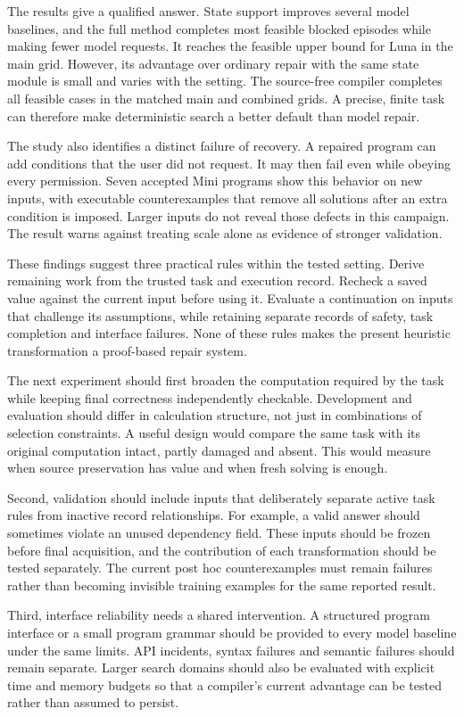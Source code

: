 \documentclass[conference]{IEEEtran}
\begin{document}
The results give a qualified answer. State support improves several model baselines, and the full method completes most feasible blocked episodes while making fewer model requests. It reaches the feasible upper bound for Luna in the main grid. However, its advantage over ordinary repair with the same state module is small and varies with the setting. The source-free compiler completes all feasible cases in the matched main and combined grids. A precise, finite task can therefore make deterministic search a better default than model repair.

The study also identifies a distinct failure of recovery. A repaired program can add conditions that the user did not request. It may then fail even while obeying every permission. Seven accepted Mini programs show this behavior on new inputs, with executable counterexamples that remove all solutions after an extra condition is imposed. Larger inputs do not reveal those defects in this campaign. The result warns against treating scale alone as evidence of stronger validation.

These findings suggest three practical rules within the tested setting. Derive remaining work from the trusted task and execution record. Recheck a saved value against the current input before using it. Evaluate a continuation on inputs that challenge its assumptions, while retaining separate records of safety, task completion and interface failures. None of these rules makes the present heuristic transformation a proof-based repair system.

The next experiment should first broaden the computation required by the task while keeping final correctness independently checkable. Development and evaluation should differ in calculation structure, not just in combinations of selection constraints. A useful design would compare the same task with its original computation intact, partly damaged and absent. This would measure when source preservation has value and when fresh solving is enough.

Second, validation should include inputs that deliberately separate active task rules from inactive record relationships. For example, a valid answer should sometimes violate an unused dependency field. These inputs should be frozen before final acquisition, and the contribution of each transformation should be tested separately. The current post hoc counterexamples must remain failures rather than becoming invisible training examples for the same reported result.

Third, interface reliability needs a shared intervention. A structured program interface or a small program grammar should be provided to every model baseline under the same limits. API incidents, syntax failures and semantic failures should remain separate. Larger search domains should also be evaluated with explicit time and memory budgets so that a compiler's current advantage can be tested rather than assumed to persist.
\end{document}
